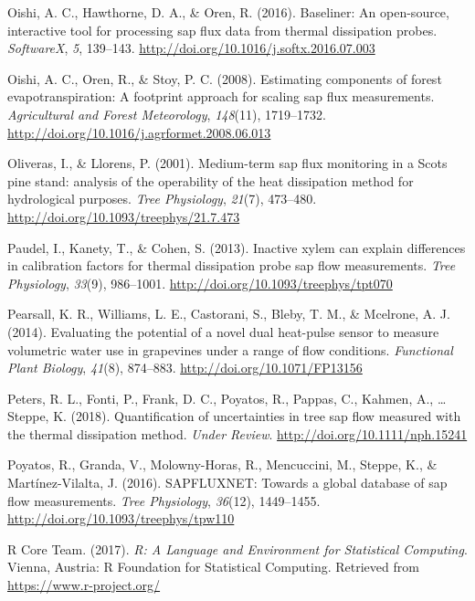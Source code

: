 \documentclass[11pt,twoside]{reedthesis}
\begin{document}
\hypertarget{ref-Oishi2016}{}
Oishi, A. C., Hawthorne, D. A., \& Oren, R. (2016). Baseliner: An
open-source, interactive tool for processing sap flux data from thermal
dissipation probes. \emph{SoftwareX}, \emph{5}, 139--143.
\url{http://doi.org/10.1016/j.softx.2016.07.003}

\hypertarget{ref-Oishi2008}{}
Oishi, A. C., Oren, R., \& Stoy, P. C. (2008). Estimating components of
forest evapotranspiration: A footprint approach for scaling sap flux
measurements. \emph{Agricultural and Forest Meteorology},
\emph{148}(11), 1719--1732.
\url{http://doi.org/10.1016/j.agrformet.2008.06.013}

\hypertarget{ref-Oliveras2001}{}
Oliveras, I., \& Llorens, P. (2001). Medium-term sap flux monitoring in
a Scots pine stand: analysis of the operability of the heat dissipation
method for hydrological purposes. \emph{Tree Physiology}, \emph{21}(7),
473--480. \url{http://doi.org/10.1093/treephys/21.7.473}

\hypertarget{ref-Paudel2013}{}
Paudel, I., Kanety, T., \& Cohen, S. (2013). Inactive xylem can explain
differences in calibration factors for thermal dissipation probe sap
flow measurements. \emph{Tree Physiology}, \emph{33}(9), 986--1001.
\url{http://doi.org/10.1093/treephys/tpt070}

\hypertarget{ref-Pearsall2014}{}
Pearsall, K. R., Williams, L. E., Castorani, S., Bleby, T. M., \&
Mcelrone, A. J. (2014). Evaluating the potential of a novel dual
heat-pulse sensor to measure volumetric water use in grapevines under a
range of flow conditions. \emph{Functional Plant Biology}, \emph{41}(8),
874--883. \url{http://doi.org/10.1071/FP13156}

\hypertarget{ref-Peters2018}{}
Peters, R. L., Fonti, P., Frank, D. C., Poyatos, R., Pappas, C., Kahmen,
A., \ldots{} Steppe, K. (2018). Quantification of uncertainties in tree
sap flow measured with the thermal dissipation method. \emph{Under
Review}. \url{http://doi.org/10.1111/nph.15241}

\hypertarget{ref-Poyatos2016}{}
Poyatos, R., Granda, V., Molowny-Horas, R., Mencuccini, M., Steppe, K.,
\& Martínez-Vilalta, J. (2016). SAPFLUXNET: Towards a global database of
sap flow measurements. \emph{Tree Physiology}, \emph{36}(12),
1449--1455. \url{http://doi.org/10.1093/treephys/tpw110}

\hypertarget{ref-RCoreTeam2017}{}
R Core Team. (2017). \emph{R: A Language and Environment for Statistical
Computing}. Vienna, Austria: R Foundation for Statistical Computing.
Retrieved from \url{https://www.r-project.org/}
\end{document}

